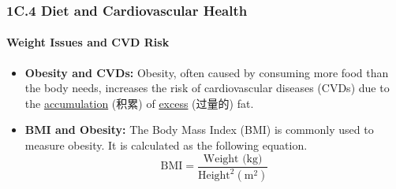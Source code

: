 
\subsubsection{1C.4 Diet and Cardiovascular Health}
\paragraph{Weight Issues and CVD Risk}
\begin{itemize}
    \item \textbf{Obesity and CVDs:} Obesity, often caused by consuming more food than the body needs, increases the risk of
    cardiovascular diseases (CVDs) due to the \underline{accumulation} (积累) of \underline{excess} (过量的) fat.
    \item \textbf{BMI and Obesity:} The Body Mass Index (BMI) is commonly used to measure obesity. It is calculated as the
    following equation.
    \begin{equation}
        \text{BMI} = \frac{\text{Weight (kg)}}{\text{Height}^2 (\text{m}^2)}
    \end{equation}
\end{itemize}

